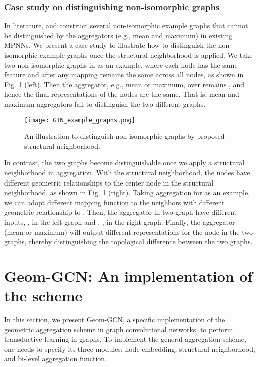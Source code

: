 \documentclass{article} \usepackage{iclr2020_conference,times}
\begin{document}
\vspace{-2mm}
\subsubsection{Case study on distinguishing non-isomorphic graphs}
\vspace{-2mm}
In literature, \cite{DBLP:conf/iclr/KondorSPAT18} and \cite{xu2018how} construct several non-isomorphic example graphs that cannot be distinguished by the aggregators (e.g., mean and maximum) in existing MPNNs. 
We present a case study to illustrate how to distinguish the non-isomorphic example graphs once the structural neighborhood is applied.
We take two non-isomorphic graphs in \citep{xu2018how} as an example, where each node has the same feature  and after any mapping  remains the same across all nodes, as shown in Fig. \ref{fig:example} (left).
Then the aggregator, e.g., mean or maximum, over  remains , and hence the final representations of the nodes are the same. 
That is, mean and maximum aggregators fail to distinguish the two different graphs.

\begin{figure}[!t]
\begin{center}
\texttt{[image: GIN\_example\_graphs.png]}
\end{center} 
\caption{An illustration to distinguish non-isomorphic graphs by proposed structural neighborhood.}
\label{fig:example}
\vspace{-4mm}
\end{figure}

In contrast, the two graphs become distinguishable once we apply a structural neighborhood in aggregation.
With the structural neighborhood, the nodes have different geometric relationships to the center node  in the structural neighborhood, as shown in Fig. \ref{fig:example} (right).
Taking aggregation for  as an example, we can adopt different mapping function  to the neighbors with different geometric relationship  to .
Then, the aggregator in two graph have different inputs, ,  in the left graph and , ,  in the right graph.
Finally, the aggregator (mean or maximum) will output different representations for the node  in the two graphs,  thereby distinguishing the topological difference between the two graphs.

\vspace{-2.5mm}
\section{Geom-GCN: An implementation of the scheme}
\vspace{-2.5mm}
In this section, we present Geom-GCN, a specific implementation of the geometric aggregation scheme in graph convolutional networks, to perform transductive learning in graphs.
To implement the general aggregation scheme, one needs to specify its three modules: node embedding, structural neighborhood, and bi-level aggregation function.
\end{document}
